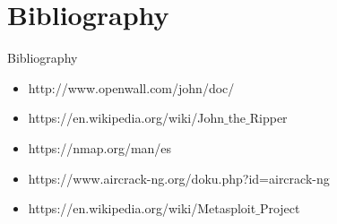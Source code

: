 \documentclass{beamer}
\begin{document}
\section{Bibliography}
\begin{frame}{Bibliography}
\begin{itemize}
	\item http://www.openwall.com/john/doc/
	\item https://en.wikipedia.org/wiki/John$\_$the$\_$Ripper
	\item https://nmap.org/man/es
	\item https://www.aircrack-ng.org/doku.php?id=aircrack-ng
	\item https://en.wikipedia.org/wiki/Metasploit$\_$Project
\end{itemize}
\end{frame}  
\end{document}
